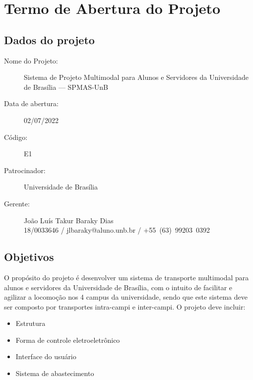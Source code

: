\chapter{Termo de Abertura do Projeto}

\section{Dados do projeto}

\begin{description}
    \item [Nome do Projeto:] Sistema de Projeto Multimodal para Alunos e Servidores da Universidade de Brasília --- SPMAS-UnB
    \item [Data de abertura:] 02/07/2022
    \item [Código:] E1
    \item [Patrocinador:] Universidade de Brasília
    \item [Gerente:] João Luís Takur Baraky Dias \\ 18/0033646 / jlbaraky@aluno.unb.br / +55~(63)~99203~0392
\end{description}

\section{Objetivos}

O propósito do projeto é desenvolver um sistema de transporte multimodal para alunos e servidores da Universidade de Brasília, com o intuito de facilitar e agilizar a locomoção nos 4 campus da universidade, sendo que este sistema deve ser composto por transportes intra-campi e inter-campi. O projeto deve incluir:

\begin{itemize}
    \item Estrutura
    \item Forma de controle eletroeletrônico
    \item Interface do usuário
    \item Sistema de abastecimento
\end{itemize}


